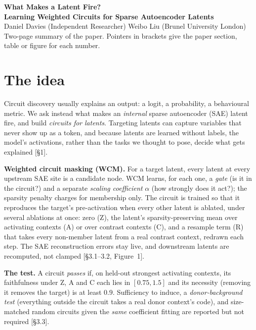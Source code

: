 \documentclass[10pt]{article}
\newcommand{\paperref}[1]{{\small[#1]}}
\begin{document}
\begin{center}
{\Large\bfseries What Makes a Latent Fire?\\[0.15em] Learning Weighted Circuits for Sparse Autoencoder Latents}\\[0.5em]
{\large Daniel Davies (Independent Researcher) \quad Weibo Liu (Brunel University London)}\\[0.3em]
{\small Two-page summary of the paper. Pointers in brackets give the paper section, table or figure for each number.}
\end{center}

\section*{The idea}
Circuit discovery usually explains an output: a logit, a probability, a behavioural metric.
We ask instead what makes an \emph{internal} sparse autoencoder (SAE) latent fire, and build \emph{circuits for latents}.
Targeting latents can capture variables that never show up as a token, and because latents are learned without labels, the model's activations, rather than the tasks we thought to pose, decide what gets explained \paperref{§1}.

\textbf{Weighted circuit masking (WCM).}
For a target latent, every latent at every upstream SAE site is a candidate node.
WCM learns, for each one, a \emph{gate} (is it in the circuit?) and a separate \emph{scaling coefficient} $\alpha$ (how strongly does it act?); the sparsity penalty charges for membership only.
The circuit is trained so that it reproduces the target's pre-activation when every other latent is ablated, under several ablations at once: zero (Z), the latent's sparsity-preserving mean over activating contexts (A) or over contrast contexts (C), and a resample term (R) that takes every non-member latent from a real contrast context, redrawn each step.
The SAE reconstruction errors stay live, and downstream latents are recomputed, not clamped \paperref{§3.1--3.2, Figure~1}.

\textbf{The test.}
A circuit \emph{passes} if, on held-out strongest activating contexts, its faithfulness under Z, A and C each lies in $[0.75, 1.5]$ and its necessity (removing it removes the target) is at least $0.9$.
Sufficiency to induce, a \emph{donor-background test} (everything outside the circuit takes a real donor context's code), and size-matched random circuits given the \emph{same} coefficient fitting are reported but not required \paperref{§3.3}.
\end{document}
